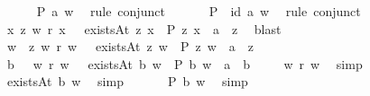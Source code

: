 \begin{isabellebody}
\isanewline
\ \ \isamarkupfalse%
\ {}{\isacharcolon}\ {\isachardoublequoteopen}{\isasymE}\ P\ a\ w{\isachardoublequoteclose}\ \isamarkupfalse%
\ {\isacharparenleft}rule\ conjunct{}{\isacharparenright}\isanewline
\ \ \isamarkupfalse%
\ {}\ \isamarkupfalse%
\ {\isachardoublequoteopen}{\isacharparenleft}\isactrlbold {\isasymnot}{\isacharparenleft}P\ {\isasymRrightarrow}\ id\ a{\isacharparenright}{\isacharparenright}\ w{\isachardoublequoteclose}\ \isamarkupfalse%
\ {\isacharparenleft}rule\ conjunct{}{\isacharparenright}\isanewline
\ \ \isamarkupfalse%
\ {\isachardoublequoteopen}{\isasymexists}x{\isachardot}\ {\isasymexists}z{\isachardot}\ w\ r\ x\ {\isasymand}\ \ existsAt\ z\ x\ {\isasymand}\ P\ z\ x\ {\isasymand}\ {\isasymnot}{\isacharparenleft}a\ {\isacharequal}\ z{\isacharparenright}{\isachardoublequoteclose}\ \isamarkupfalse%
\ blast\isanewline
\ \ \isamarkupfalse%
\ \isamarkupfalse%
\ w{}\ \ {\isachardoublequoteopen}{\isasymexists}z{\isachardot}\ w\ r\ w{}\ {\isasymand}\ \ existsAt\ z\ w{}\ {\isasymand}\ P\ z\ w{}\ {\isasymand}\ {\isasymnot}{\isacharparenleft}a\ {\isacharequal}\ z{\isacharparenright}{\isachardoublequoteclose}\ \isacommand{{\isachardot}{\isachardot}}\isamarkupfalse%
\isanewline
\ \ \isamarkupfalse%
\ \isamarkupfalse%
\ b\ \ {}{\isacharcolon}\ {\isachardoublequoteopen}w\ r\ w{}\ {\isasymand}\ \ existsAt\ b\ w{}\ {\isasymand}\ P\ b\ w{}\ {\isasymand}\ {\isasymnot}{\isacharparenleft}a\ {\isacharequal}\ b{\isacharparenright}{\isachardoublequoteclose}\ \isacommand{{\isachardot}{\isachardot}}\isamarkupfalse%
\isanewline
\ \ \isamarkupfalse%
\ {\isachardoublequoteopen}w\ r\ w{}{\isachardoublequoteclose}\ \isamarkupfalse%
\ simp\isanewline
\ \ \isamarkupfalse%
\ {}\ \isamarkupfalse%
\ {\isachardoublequoteopen}existsAt\ b\ w{}{\isachardoublequoteclose}\ \isamarkupfalse%
\ simp\isanewline
\ \ \isamarkupfalse%
\ {}\ \isamarkupfalse%
\ {\isachardoublequoteopen}P\ b\ w{}{\isachardoublequoteclose}\ \isamarkupfalse%
\ simp\isanewline
\ \ \isamarkupfalse%
\ {}\ \isamarkupfalse%

\end{isabellebody}

